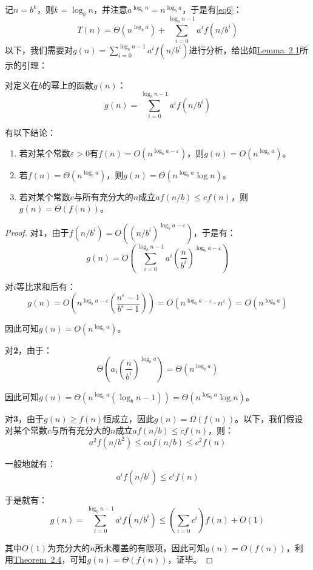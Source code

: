 \documentclass[12pt,a4paper,violet]{bbe}
\begin{document}
记$n=b^k$，则$k=\log_bn$，并注意$a^{\log_bn}=n^{\log_ba}$，于是有\cref{eq6}：
\begin{equation}
	T(n)=\Theta(n^{\log_ba})+\sum\limits_{i=0}^{\log_bn-1}a^if(n/b^i)
	\label{eq6}
\end{equation}
以下，我们需要对$g(n)=\sum\limits_{i=0}^{\log_bn-1}a^if(n/b^i)$进行分析，给出如\hyperref[le2.1]{Lemma~2.1}所示的引理：
\begin{lemma}\label{le2.1}
	对定义在$b$的幂上的函数$g(n)$：
	$$
	g(n)=\sum\limits_{i=0}^{\log_bn-1}a^if(n/b^i)
	$$

有以下结论：
\begin{enumerate}
	\item 若对某个常数$\varepsilon>0$有$f(n)=O(n^{\log_ba-\varepsilon})$，则$g(n)=O(n^{\log_ba})$。
	\item 若$f(n)=\Theta(n^{\log_ba})$，则$g(n)=\Theta(n^{\log_ba}\log n)$。
	\item 若对某个常数$c$与所有充分大的$n$成立$af(n/b)\leqslant cf(n)$，则$g(n)=\Theta(f(n))$。
\end{enumerate}
\end{lemma}
\begin{proof}
	对\textbf{1}，由于$f(n/b^i)=O((n/b^i)^{\log_ba-\varepsilon})$，于是有：
	$$
	g(n)=O\left(\sum\limits_{i=0}^{\log_bn-1}a^i\left(\frac{n}{b^i}\right)^{\log_ba-\varepsilon}\right)
	$$
	
	对$i$等比求和后有：
	$$
	g(n)=O\left(n^{\log_ba-\varepsilon}\left(\frac{n^\varepsilon-1}{b^\varepsilon-1}\right)\right)=O(n^{\log_ba-\varepsilon}\cdot n^\varepsilon)=O(n^{\log_ba})
	$$
	
	因此可知$g(n)=O(n^{\log_ba})$。
	
	对\textbf{2}，由于：
	$$
	\Theta\left(a_i\left(\frac{n}{b^i}\right)^{\log_ba}\right)=\Theta(n^{\log_ba})
	$$
	
	因此可知$g(n)=\Theta(n^{\log_ba}(\log_b n-1))=\Theta(n^{\log_ba}\log n)$。
	
	对\textbf{3}，由于$g(n)\geqslant f(n)$恒成立，因此$g(n)=\Omega(f(n))$。以下，我们假设对某个常数$c$与所有充分大的$n$成立$af(n/b)\leqslant cf(n)$，则：
	$$
	a^2f(n/b^2)\leqslant caf(n/b)\leqslant c^2f(n)
	$$
	
	一般地就有：
	$$
	a^if(n/b^i)\leqslant c^if(n)
	$$
	
	于是就有：
	$$
	g(n)=\sum\limits_{i=0}^{\log_bn-1}a^if(n/b^i)\leqslant \left(\sum\limits_{i=0}c^i\right)f(n)+O(1)
	$$
	
	其中$O(1)$为充分大的$n$所未覆盖的有限项，因此可知$g(n)=O(f(n))$，利用\hyperref[the2.4]{Theorem~2.4}，可知$g(n)=\Theta(f(n))$，证毕。
\end{proof}
\end{document}
